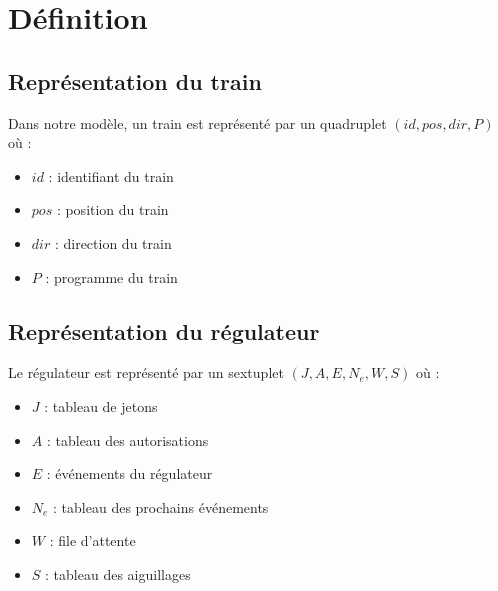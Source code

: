 \documentclass[12pt]{article}
\begin{document}
\newcommand\ruleCrash[2]{ %
    \inferrule
        {#1 \neq #2}
        {\Gamma, \train{#1}{pos}{dir}{P}, \train{#2}{pos}{dir'}{P'}  \Rightarrow \bot}
}

\newcommand\ruleCrashSec[3]{ %
    \inferrule
        {\lnot suiv(#2, #3) = \emptyset \\ #3 \neq * \\ R.A[#1] \neq #2}
        {\trainfull{#1}{#2}{#3}{P}, R \Rightarrow \bot}
}


\maketitle


\section{Définition}

\subsection{Représentation du train}
Dans notre modèle, un train est représenté par un quadruplet $(id, pos, dir, P)$ où :
\begin{itemize}
    \item $id$ : identifiant du train
    \item $pos$ : position du train 
    \item $dir$ : direction du train
    \item $P$ : programme du train
\end{itemize}

\subsection{Représentation du régulateur}
Le régulateur est représenté par un sextuplet $(J, A, E, N_e, W, S)$ où :
\begin{itemize}
    \item $J$ : tableau de jetons
    \item $A$ : tableau des autorisations
    \item $E$ : événements du régulateur
    \item $N_e$ : tableau des prochains événements
    \item $W$ : file d'attente
    \item $S$ : tableau des aiguillages
\end{itemize}
\end{document}

